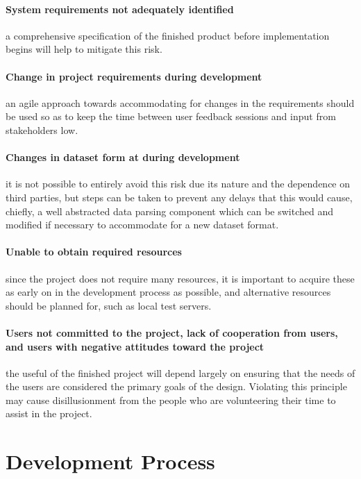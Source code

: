 \documentclass[12pt,a4paper]{article}
\begin{document}
\paragraph{System requirements not adequately identified} a comprehensive specification
of the finished product before implementation begins will help to mitigate this
risk.

\paragraph{Change in project requirements during development} an agile approach towards
accommodating for changes in the requirements should be used so as to keep the
time between user feedback sessions and input from stakeholders low.

\paragraph{Changes in dataset form at during development} it is not possible to entirely
avoid this risk due its nature and the dependence on third parties, but steps
can be taken to prevent any delays that this would cause, chiefly, a well
abstracted data parsing component which can be switched and modified if
necessary to accommodate for a new dataset format.

\paragraph{Unable to obtain required resources} since the project does not require many
resources, it is important to acquire these as early on in the development
process as possible, and alternative resources should be planned for, such as
local test servers.

\paragraph{Users not committed to the project, lack of cooperation from users,
  and users with negative attitudes toward the project} the useful of the
finished project will depend largely on ensuring that the needs of the users are
considered the primary goals of the design. Violating this principle may cause
disillusionment from the people who are volunteering their time to assist in the
project.

\section{Development Process}
\end{document}
